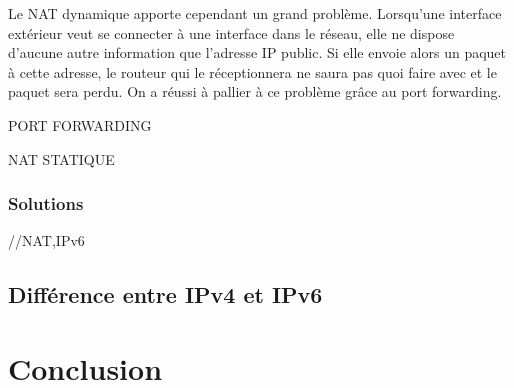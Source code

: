 \documentclass[twoside,openright,a4paper,11pt,french]{article}
\begin{document}
Le NAT dynamique apporte cependant un grand problème. Lorsqu'une interface extérieur veut se connecter à une interface dans le réseau, elle ne dispose d'aucune autre information que l'adresse IP public. Si elle envoie alors un paquet à cette adresse, le routeur qui le réceptionnera ne saura pas quoi faire avec et le paquet sera perdu. 
 On a réussi à pallier à ce problème grâce au port forwarding. 

PORT FORWARDING

NAT STATIQUE


\subsubsection{Solutions}
//NAT,IPv6
\subsection{Différence entre IPv4 et IPv6}

\section{Conclusion}
\label{sec:ccl}



\end{document}
